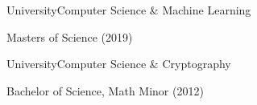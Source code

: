 \documentclass{article}
\newenvironment{*mylist}[2]{
  \subsection*{#1}
  \small
  \begin{list}{}{}
   \setlength{\topsep}{0pt}
   \setlength{\itemsep}{1pt}
   \setlength{\parskip}{0pt}
   \setlength{\parsep}{0pt}
 \item {\bf #2}
}{\end{list}\normalsize}
\newcommand{\LUx}[1]{{\bf\em #1}}
\begin{document}
\begin{comment}
\item \href{https://github.com/probinso/adarailz}{AdaRailz Concurrent Model Train Control System}\hfill\LUx{Ada}
\item TwixT AI Agent and UI\hfill\LUx{Java}
\item Image Manipulation Program \hfill\LUx{C\#}
\item Unix Shell \hfill\LUx{C}
\end{**mylist}
\normalsize
\end{comment}

\BSec{}%

\begin{multicols}{2}

  \begin{*mylist}{ University}{Computer Science \& Machine Learning}
    \item Masters of Science (2019)
\end{*mylist}\columnbreak

  \raggedright
  \begin{*mylist}{ University}{Computer Science \& Cryptography}
  \item Bachelor of Science, Math Minor (2012)
  \end{*mylist}
\end{multicols}
\end{document}
